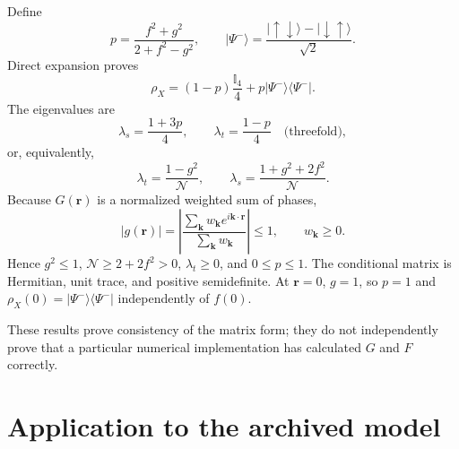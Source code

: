 \documentclass[11pt]{article}
\begin{document}
Define
\begin{equation}
p=\frac{f^2+g^2}{2+f^2-g^2},\qquad
|\Psi^-\rangle=\frac{|\uparrow\downarrow\rangle-|\downarrow\uparrow\rangle}{\sqrt2}.
\end{equation}
Direct expansion proves
\begin{equation}
\rho_X=(1-p)\frac{\mathbb I_4}{4}+p|\Psi^-\rangle\langle\Psi^-|.
\label{eq:W}
\end{equation}
The eigenvalues are
\begin{equation}
\lambda_s=\frac{1+3p}{4},\qquad \lambda_t=\frac{1-p}{4}\quad\text{(threefold)},
\end{equation}
or, equivalently,
\begin{equation}
\lambda_t=\frac{1-g^2}{\mathcal N},\qquad
\lambda_s=\frac{1+g^2+2f^2}{\mathcal N}.
\end{equation}
Because $G(\mathbf r)$ is a normalized weighted sum of phases,
\begin{equation}
|g(\mathbf r)|=\left|\frac{\sum_{\mathbf k}w_{\mathbf k}e^{i\mathbf k\cdot\mathbf r}}
{\sum_{\mathbf k}w_{\mathbf k}}\right|\leq1,\qquad w_{\mathbf k}\geq0.
\end{equation}
Hence $g^2\leq1$, $\mathcal N\geq2+2f^2>0$, $\lambda_t\geq0$, and $0\leq p\leq1$. The conditional matrix is Hermitian, unit trace, and positive semidefinite. At $\mathbf r=0$, $g=1$, so $p=1$ and $\rho_X(0)=|\Psi^-\rangle\langle\Psi^-|$ independently of $f(0)$.

These results prove consistency of the matrix form; they do not independently prove that a particular numerical implementation has calculated $G$ and $F$ correctly.

\section{Application to the archived model}
\end{document}
